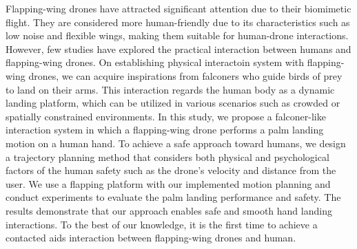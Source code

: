 Flapping-wing drones have attracted significant attention due to their biomimetic flight.
They are considered more human-friendly due to its characteristics such as low noise and flexible wings, 
making them suitable for human-drone interactions. 
However, few studies have explored the practical interaction between humans and flapping-wing drones. 
On establishing physical interactoin system with flapping-wing drones,
we can acquire inspirations from falconers who guide birds of prey to land on their arms.
This interaction regards the human body as a dynamic landing platform, which can be utilized in various scenarios such as crowded or spatially constrained environments.
In this study, we propose a falconer-like interaction system in which a flapping-wing drone performs a palm landing motion on a human hand. 
To achieve a safe approach toward humans, we design a trajectory planning method that considers both physical and psychological factors of the human safety such as the drone's velocity and distance from the user.
We use a flapping platform with our implemented motion planning and conduct experiments to evaluate the palm landing performance and safety.
The results demonstrate that our approach enables safe and smooth hand landing interactions. 
To the best of our knowledge, it is the first time to achieve a contacted aids interaction between flapping-wing drones and human.